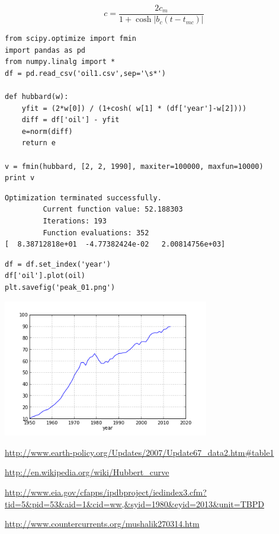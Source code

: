 \documentclass[12pt,fleqn]{article}\usepackage{../common}
\begin{document}
$$ 
c = \frac{ 2c_m}{1 + \cosh |b_c(t-t_{mc})|   }
$$


\begin{verbatim}
from scipy.optimize import fmin
import pandas as pd
from numpy.linalg import *
df = pd.read_csv('oil1.csv',sep='\s*')

def hubbard(w):
    yfit = (2*w[0]) / (1+cosh( w[1] * (df['year']-w[2])))
    diff = df['oil'] - yfit
    e=norm(diff)
    return e

v = fmin(hubbard, [2, 2, 1990], maxiter=100000, maxfun=10000)
print v
\end{verbatim}

\begin{verbatim}
Optimization terminated successfully.
         Current function value: 52.188303
         Iterations: 193
         Function evaluations: 352
[  8.38712818e+01  -4.77382424e-02   2.00814756e+03]
\end{verbatim}

\begin{verbatim}
df = df.set_index('year')
df['oil'].plot(oil)
plt.savefig('peak_01.png')
\end{verbatim}

\includegraphics[height=6cm]{peak_01.png}

\url{http://www.earth-policy.org/Updates/2007/Update67_data2.htm#table1}

\url{http://en.wikipedia.org/wiki/Hubbert_curve}

\url{http://www.eia.gov/cfapps/ipdbproject/iedindex3.cfm?tid=5&pid=53&aid=1&cid=ww,&syid=1980&eyid=2013&unit=TBPD}

\url{http://www.countercurrents.org/mushalik270314.htm}
\end{document}
